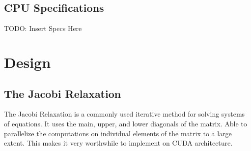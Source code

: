 \documentclass[10pt]{article}
\begin{document}
\begin{multicols}{2}
  \subsection{CPU Specifications}
  TODO: Insert Specs Here

  \section{Design}
  \subsection{The Jacobi Relaxation}
  The Jacobi Relaxation is a commonly used iterative method for solving systems of equations.
  It uses the main, upper, and lower diagonals of the matrix.
  Able to parallelize the computations on individual elements of the matrix to a large extent.
  This makes it very worthwhile to implement on CUDA architecture.


\end{multicols}
\end{document}
